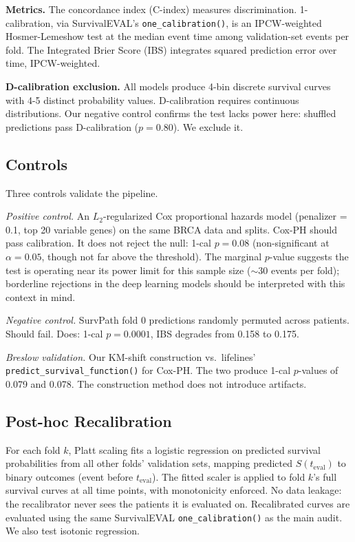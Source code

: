 \documentclass[pmlr]{jmlr}
\begin{document}
\textbf{Metrics.} The concordance index (C-index) measures discrimination. 1-calibration, via SurvivalEVAL's \texttt{one\_calibration()}, is an IPCW-weighted Hosmer-Lemeshow test at the median event time among validation-set events per fold. The Integrated Brier Score (IBS) integrates squared prediction error over time, IPCW-weighted.

\textbf{D-calibration exclusion.} All models produce 4-bin discrete survival curves with 4-5 distinct probability values. D-calibration requires continuous distributions. Our negative control confirms the test lacks power here: shuffled predictions pass D-calibration ($p = 0.80$). We exclude it.

\subsection{Controls}

Three controls validate the pipeline.

\textit{Positive control.} An $L_2$-regularized Cox proportional hazards model (penalizer = 0.1, top 20 variable genes) on the same BRCA data and splits. Cox-PH should pass calibration. It does not reject the null: 1-cal $p = 0.08$ (non-significant at $\alpha = 0.05$, though not far above the threshold). The marginal $p$-value suggests the test is operating near its power limit for this sample size ($\sim$30 events per fold); borderline rejections in the deep learning models should be interpreted with this context in mind.

\textit{Negative control.} SurvPath fold 0 predictions randomly permuted across patients. Should fail. Does: 1-cal $p = 0.0001$, IBS degrades from 0.158 to 0.175.

\textit{Breslow validation.} Our KM-shift construction vs.\ lifelines' \texttt{predict\_survival\_function()} \citep{davidsonpilon2019lifelines} for Cox-PH. The two produce 1-cal $p$-values of 0.079 and 0.078. The construction method does not introduce artifacts.

\subsection{Post-hoc Recalibration}

For each fold $k$, Platt scaling \citep{platt1999probabilistic} fits a logistic regression on predicted survival probabilities from all other folds' validation sets, mapping predicted $S(t_{\text{eval}})$ to binary outcomes (event before $t_{\text{eval}}$). The fitted scaler is applied to fold $k$'s full survival curves at all time points, with monotonicity enforced. No data leakage: the recalibrator never sees the patients it is evaluated on. Recalibrated curves are evaluated using the same SurvivalEVAL \texttt{one\_calibration()} as the main audit. We also test isotonic regression.
\end{document}
